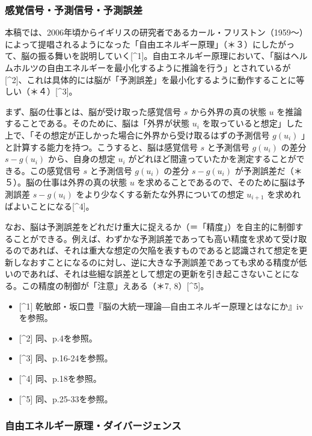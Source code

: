 \subsubsection{感覚信号・予測信号・予測誤差}\label{ux611fux899aux4fe1ux53f7ux4e88ux6e2cux4fe1ux53f7ux4e88ux6e2cux8aa4ux5dee}

本稿では、2006年頃からイギリスの研究者であるカール・フリストン（1959～）によって提唱されるようになった「自由エネルギー原理」（＊３）にしたがって、脳の振る舞いを説明していく{[}\^{}1{]}。自由エネルギー原理において、「脳はヘルムホルツの自由エネルギーを最小化するように推論を行う」とされているが{[}\^{}2{]}、これは具体的には脳が「予測誤差」を最小化するように動作することに等しい（＊４）{[}\^{}3{]}。

まず、脳の仕事とは、脳が受け取った感覚信号 \(s\) から外界の真の状態
\(u\) を推論することである。そのために、脳は「外界が状態 \(u_i\)
を取っていると想定」した上で、「その想定が正しかった場合に外界から受け取るはずの予測信号
\(g(u_i)\) 」と計算する能力を持つ。こうすると、脳は感覚信号 \(s\)
と予測信号 \(g(u_i)\) の差分 \(s-g(u_i)\) から、自身の想定 \(u_i\)
がどれほど間違っていたかを測定することができる。この感覚信号 \(s\)
と予測信号 \(g(u_i)\) の差分 \(s-g(u_i)\)
が予測誤差だ（＊５）。脳の仕事は外界の真の状態 \(u\)
を求めることであるので、そのために脳は予測誤差 \(s-g(u_i)\)
をより少なくする新たな外界についての想定 \(u_{i+1}\)
を求めればよいことになる{[}\^{}4{]}。

なお、脳は予測誤差をどれだけ重大に捉えるか（＝「精度」）を自主的に制御することができる。例えば、わずかな予測誤差であっても高い精度を求めて受け取るのであれば、それは重大な想定の欠陥を表すものであると認識されて想定を更新しなおすことになるのに対し、逆に大きな予測誤差であっても求める精度が低いのであれば、それは些細な誤差として想定の更新を引き起こさないことになる。この精度の制御が「注意」えある（＊7,
8）{[}\^{}5{]}。

\begin{itemize}
\tightlist
\item
  {[}\^{}1{]}
  乾敏郎・坂口豊『脳の大統一理論―自由エネルギー原理とはなにか』ivを参照。
\item
  {[}\^{}2{]} 同、p.4を参照。
\item
  {[}\^{}3{]} 同、p.16-24を参照。
\item
  {[}\^{}4{]} 同、p.18を参照。
\item
  {[}\^{}5{]} 同、p.25-33を参照。
\end{itemize}

\subsubsection{自由エネルギー原理・ダイバージェンス}\label{ux81eaux7531ux30a8ux30cdux30ebux30aeux30fcux539fux7406ux30c0ux30a4ux30d0ux30fcux30b8ux30a7ux30f3ux30b9}

